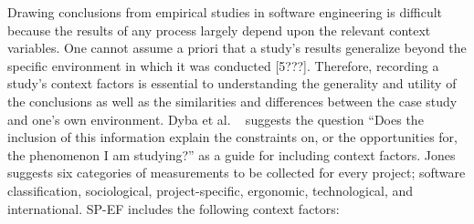 Drawing conclusions from empirical studies in software engineering is difficult because the results of  any process largely depend upon the relevant context variables. One cannot assume a priori that a study’s results generalize beyond the specific environment in which it was conducted [5???]. Therefore, recording a study’s context factors is essential to understanding the generality and utility of the conclusions as well as the similarities and differences between the case study and one’s own environment. Dyba et al. ~\cite{dyba2012what} suggests the question “Does the inclusion of this information explain the constraints on, or the opportunities for, the phenomenon I am studying?” as a guide for including context factors. Jones~\cite{jones2000software} suggests six categories of measurements to be collected for every project; software classification, sociological, project-specific, ergonomic, technological, and international. SP-EF includes the following context factors:
